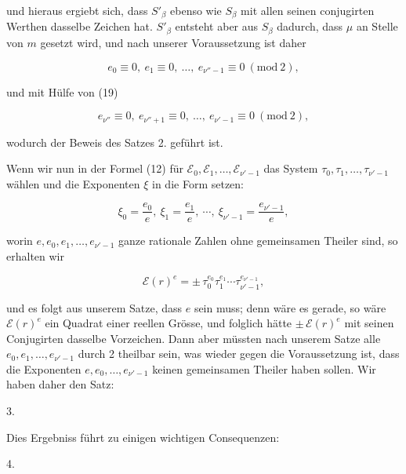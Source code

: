 
und hieraus ergiebt sich, dass $S'_\beta$ ebenso wie $S_\beta$ mit allen seinen conjugirten Werthen dasselbe Zeichen hat. $S'_\beta$ entsteht aber aus $S_\beta$ dadurch, dass $\mu$ an Stelle von $m$ gesetzt wird, und nach unserer Voraussetzung ist daher

\[
e_0 \equiv 0,\ e_1 \equiv 0,\ \ldots,\ e_{\nu''-1} \equiv 0 \ (\mathrm{mod}\ 2),
\]

und mit Hülfe von (19)

\[
e_{\nu''} \equiv 0,\ e_{\nu''+1} \equiv 0,\ \ldots,\ e_{\nu'-1} \equiv 0 \ (\mathrm{mod}\ 2),
\]

wodurch der Beweis des Satzes 2. geführt ist.

Wenn wir nun in der Formel (12) für $\mathcal{E}_0, \mathcal{E}_1, \ldots, \mathcal{E}_{\nu'-1}$ das System $\tau_0, \tau_1, \ldots, \tau_{\nu'-1}$ wählen und die Exponenten $\xi$ in die Form setzen:

\[
\xi_0 = \frac{e_0}{e},\ \xi_1 = \frac{e_1}{e},\ \cdots,\ \xi_{\nu'-1} = \frac{e_{\nu'-1}}{e},
\]

worin $e, e_0, e_1, \ldots, e_{\nu'-1}$ ganze rationale Zahlen ohne gemeinsamen Theiler sind, so erhalten wir

\[
\mathcal{E}(r)^e = \pm\, \tau_0^{e_0}\tau_1^{e_1} \cdots \tau_{\nu'-1}^{e_{\nu'-1}},
\]

und es folgt aus unserem Satze, dass $e$  sein muss; denn wäre es gerade, so wäre $\mathcal{E}(r)^e$ ein Quadrat einer reellen Grösse, und folglich hätte $\pm\, \mathcal{E}(r)^e$ mit seinen Conjugirten dasselbe Vorzeichen. Dann aber müssten nach unserem Satze alle $e_0, e_1, \ldots, e_{\nu'-1}$ durch 2 theilbar sein, was wieder gegen die Voraussetzung ist, dass die Exponenten $e, e_0, \ldots, e_{\nu'-1}$ keinen gemeinsamen Theiler haben sollen. Wir haben daher den Satz:

3. 



Dies Ergebniss führt zu einigen wichtigen Consequenzen:

4. 


